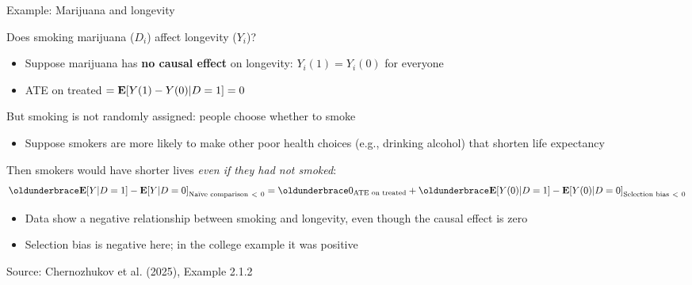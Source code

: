 \documentclass[compress, 8pt]{beamer}
\begin{document}
\begin{frame}{Example: Marijuana and longevity}

Does smoking marijuana ($D_i$) affect longevity ($Y_i$)?
\begin{itemize}
    \item Suppose marijuana has \textbf{no causal effect} on longevity: $Y_i(1) = Y_i(0)$ for everyone
    \item[$\implies$] ATE on treated $= \mathbf{E} [Y(1) - Y(0) \vert D = 1] = 0$
\end{itemize}

\vspace{2ex}
But smoking is not randomly assigned: people choose whether to smoke
\begin{itemize}
    \item Suppose smokers are more likely to make other poor health choices (e.g., drinking alcohol) that shorten life expectancy
\end{itemize}

\pause
\vspace{2ex}
Then smokers would have shorter lives \emph{even if they had not smoked}:
\begin{equation*}
    \underbrace{\EE [Y \vert D = 1] - \EE [Y \vert D=0]}_{\text{Na{\"i}ve comparison} \ < \ 0}
    = \underbrace{0}_{\text{ATE on treated}}
    + \underbrace{\EE [Y(0) \vert D = 1] - \EE [Y(0) \vert D=0]}_{\text{Selection bias} \ < \ 0}
\end{equation*}

\begin{itemize}
    \item Data show a negative relationship between smoking and longevity, even though the causal effect is zero
    \item Selection bias is negative here; in the college example it was positive
\end{itemize}

\vspace{2ex}
{\footnotesize Source: Chernozhukov et al. (2025), Example 2.1.2}
\end{frame}
\end{document}
